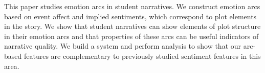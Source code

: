 This paper studies emotion arcs in student narratives. We construct emotion arcs based on event affect and implied sentiments, which correspond to plot elements in the story. We show that student narratives can show elements of plot structure in their emotion arcs and that properties of these arcs can be useful indicators of narrative quality. We build a system and perform analysis to show that our arc-based features are complementary to previously studied sentiment features in this area.
